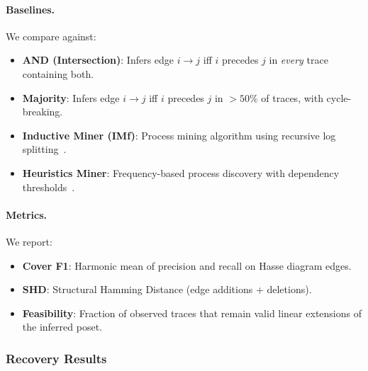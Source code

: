 \paragraph{Baselines.} We compare against:
\begin{itemize}[nosep,leftmargin=*]
    \item \textbf{AND (Intersection)}: Infers edge $i \to j$ iff $i$ precedes $j$ in \emph{every} trace containing both.
    \item \textbf{Majority}: Infers edge $i \to j$ iff $i$ precedes $j$ in $>50\%$ of traces, with cycle-breaking.
    \item \textbf{Inductive Miner (IMf)}: Process mining algorithm using recursive log splitting~\citep{leemans2013discovering}.
    \item \textbf{Heuristics Miner}: Frequency-based process discovery with dependency thresholds~\citep{weijters2006process}.
\end{itemize}

\paragraph{Metrics.} We report:
\begin{itemize}[nosep,leftmargin=*]
    \item \textbf{Cover F1}: Harmonic mean of precision and recall on Hasse diagram edges.
    \item \textbf{SHD}: Structural Hamming Distance (edge additions + deletions).
    \item \textbf{Feasibility}: Fraction of observed traces that remain valid linear extensions of the inferred poset.
\end{itemize}

\subsubsection{Recovery Results}
\label{sec:rq1_recovery}

